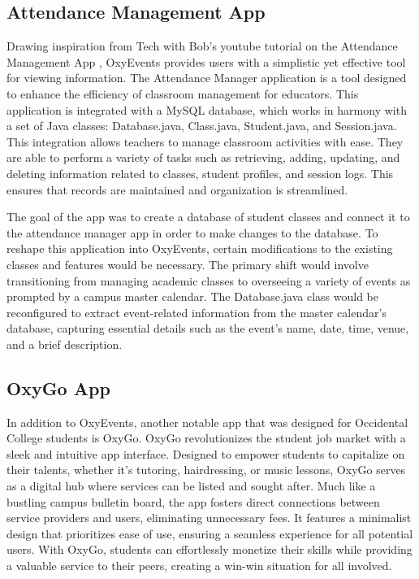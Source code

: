 \documentclass[10pt,twocolumn]{article}
\begin{document}
\subsection{Attendance Management App}
Drawing inspiration from Tech with Bob’s youtube tutorial on the Attendance Management App \cite{AttendanceApp}, OxyEvents provides users with a simplistic yet effective tool for viewing information. The Attendance Manager application is a tool designed to enhance the efficiency of classroom management for educators. This application is integrated with a MySQL database, which works in harmony with a set of Java classes: Database.java, Class.java, Student.java, and Session.java. This integration allows teachers to manage classroom activities with ease. They are able to perform a variety of tasks such as retrieving, adding, updating, and deleting information related to classes, student profiles, and session logs. This ensures that records are maintained and organization is streamlined.

The goal of the app was to create a database of student classes and connect it to the attendance manager app in order to make changes to the database. To reshape this application into OxyEvents, certain modifications to the existing classes and features would be necessary. The primary shift would involve transitioning from managing academic classes to overseeing a variety of events as prompted by a campus master calendar. The Database.java class would be reconfigured to extract event-related information from the master calendar's database, capturing essential details such as the event's name, date, time, venue, and a brief description.

\subsection{OxyGo App}
In addition to OxyEvents, another notable app that was designed for Occidental College students is OxyGo. OxyGo revolutionizes the student job market with a sleek and intuitive app interface. Designed to empower students to capitalize on their talents, whether it's tutoring, hairdressing, or music lessons, OxyGo serves as a digital hub where services can be listed and sought after. Much like a bustling campus bulletin board, the app fosters direct connections between service providers and users, eliminating unnecessary fees. It features a minimalist design that prioritizes ease of use, ensuring a seamless experience for all potential users. With OxyGo, students can effortlessly monetize their skills while providing a valuable service to their peers, creating a win-win situation for all involved.
\end{document}
